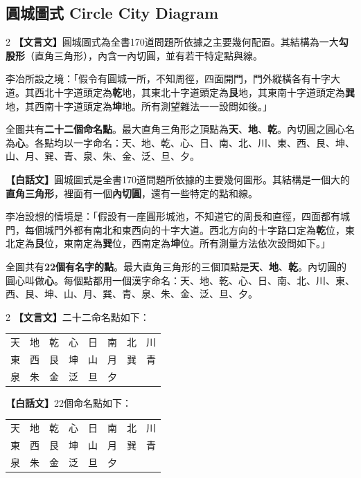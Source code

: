 \documentclass[11pt,a4paper]{article}
\begin{document}
\subsection{圓城圖式 Circle City Diagram}
\label{subsec:diagram}

\begin{paracol}{2}
\textbf{【文言文】}圓城圖式為全書170道問題所依據之主要幾何配置。其結構為一大\textbf{勾股形}（直角三角形），內含一內切圓，並有若干特定點與線。

李冶所設之境：「假令有圓城一所，不知周徑，四面開門，門外縱橫各有十字大道。其西北十字道頭定為\textbf{乾}地，其東北十字道頭定為\textbf{艮}地，其東南十字道頭定為\textbf{巽}地，其西南十字道頭定為\textbf{坤}地。所有測望雜法一一設問如後。」

全圖共有\textbf{二十二個命名點}。最大直角三角形之頂點為\textbf{天}、\textbf{地}、\textbf{乾}。內切圓之圓心名為\textbf{心}。各點均以一字命名：天、地、乾、心、日、南、北、川、東、西、艮、坤、山、月、巽、青、泉、朱、金、泛、旦、夕。

\switchcolumn
\textbf{【白話文】}圓城圖式是全書170道問題所依據的主要幾何圖形。其結構是一個大的\textbf{直角三角形}，裡面有一個\textbf{內切圓}，還有一些特定的點和線。

李冶設想的情境是：「假設有一座圓形城池，不知道它的周長和直徑，四面都有城門，每個城門外都有南北和東西向的十字大道。西北方向的十字路口定為\textbf{乾}位，東北定為\textbf{艮}位，東南定為\textbf{巽}位，西南定為\textbf{坤}位。所有測量方法依次設問如下。」

全圖共有\textbf{22個有名字的點}。最大直角三角形的三個頂點是\textbf{天}、\textbf{地}、\textbf{乾}。內切圓的圓心叫做\textbf{心}。每個點都用一個漢字命名：天、地、乾、心、日、南、北、川、東、西、艮、坤、山、月、巽、青、泉、朱、金、泛、旦、夕。
\end{paracol}

\vspace{0.3cm}

\begin{paracol}{2}
\textbf{【文言文】}二十二命名點如下：
\begin{center}
\begin{tabular}{llllllll}
\toprule
天 & 地 & 乾 & 心 & 日 & 南 & 北 & 川 \\
東 & 西 & 艮 & 坤 & 山 & 月 & 巽 & 青 \\
泉 & 朱 & 金 & 泛 & 旦 & 夕 & & \\
\bottomrule
\end{tabular}
\end{center}

\switchcolumn
\textbf{【白話文】}22個命名點如下：
\begin{center}
\begin{tabular}{llllllll}
\toprule
天 & 地 & 乾 & 心 & 日 & 南 & 北 & 川 \\
東 & 西 & 艮 & 坤 & 山 & 月 & 巽 & 青 \\
泉 & 朱 & 金 & 泛 & 旦 & 夕 & & \\
\bottomrule
\end{tabular}
\end{center}
\end{paracol}
\end{document}
